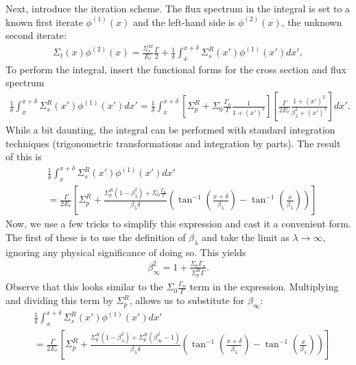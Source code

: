 Next, introduce the iteration scheme. The flux spectrum in the integral is set to a known first iterate $\phi^{(1)}(x)$ and the left-hand side is $\phi^{(2)}(x)$, the unknown second iterate:
\begin{align}
  \Sigma_t(x) \phi^{(2)}(x)  = \frac{\Sigma_s^M}{E_r} \frac{\Gamma}{2}
  + \frac{1}{\delta} \int_x^{x+\delta} \Sigma_s^R(x') \phi^{(1)}(x') dx',
\end{align}
To perform the integral, insert the functional forms for the cross section and flux spectrum
\begin{align}
  \frac{1}{\delta} \int_x^{x+\delta} \Sigma_s^R(x') \phi^{(1)}(x') dx' = 
  \frac{1}{\delta} \int_x^{x+\delta} \left[ \Sigma_p^R + \Sigma_0 \frac{\Gamma_n}{\Gamma} \frac{1}{1+(x')^2} \right]
  \left[ \frac{\Gamma}{2E_r} \frac{ 1 + (x')^2 }{ \beta_\lambda^2 + (x')^2 } \right] dx'.
\end{align} 
While a bit daunting, the integral can be performed with standard integration techniques (trigonometric transformations and integration by parts). The result of this is
\begin{align}
  &\frac{1}{\delta} \int_x^{x+\delta} \Sigma_s^R(x') \phi^{(1)}(x') dx' \nonumber \\
  &= \frac{\Gamma}{2E_r} \left[ \Sigma_p^R + \frac{ \Sigma_p^R ( 1 - \beta_\lambda^2 ) + \Sigma_0 \frac{\Gamma_n}{\Gamma} }{ \beta_\lambda \delta } 
  \left( \tan^{-1} \left( \frac{x+\delta}{\beta_\lambda} \right) - \tan^{-1} \left( \frac{x}{\beta_\lambda} \right) \right) \right]
\end{align}
Now, we use a few tricks to simplify this expression and cast it a convenient form. The first of these is to use the definition of $\beta_\lambda$ and take the limit as $\lambda \rightarrow \infty$, ignoring any physical significance of doing so. This yields
\begin{align}
  \beta_\infty^2 = 1 + \frac{\Sigma_0 \Gamma_n}{\Sigma_p^R \Gamma} .
\end{align}
Observe that this looks similar to the $\Sigma_0 \frac{\Gamma_n}{\Gamma}$ term in the expression. Multiplying and dividing this term by $\Sigma_p^R$, allows us to substitute for $\beta_\infty$:
\begin{align}
  &\frac{1}{\delta} \int_x^{x+\delta} \Sigma_s^R(x') \phi^{(1)}(x') dx' \nonumber \\
  &= \frac{\Gamma}{2E_r} \left[ \Sigma_p^R + \frac{ \Sigma_p^R ( 1 - \beta_\lambda^2 ) + \Sigma_p^R ( \beta_\infty^2 - 1 ) }{ \beta_\lambda \delta } 
  \left( \tan^{-1} \left( \frac{x+\delta}{\beta_\lambda} \right) - \tan^{-1} \left( \frac{x}{\beta_\lambda} \right) \right) \right] 
\end{align}
